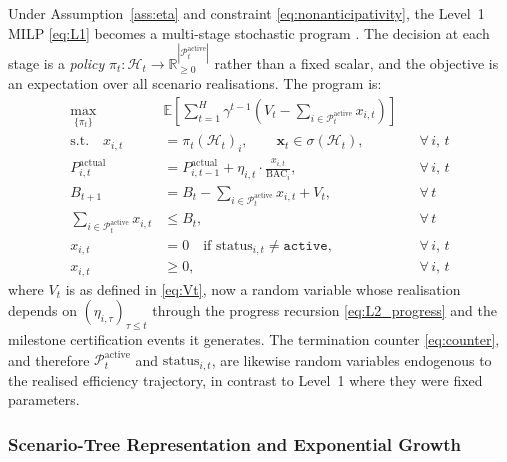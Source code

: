 Under Assumption~\ref{ass:eta} and constraint \eqref{eq:nonanticipativity},
the Level~1 MILP \eqref{eq:L1} becomes a multi-stage stochastic program
\citep{Birge2011}. The decision at each stage is a \emph{policy}
$\pi_t : \mathcal{H}_t \to \mathbb{R}^{|\mathcal{P}_t^{\mathrm{active}}|}_{\geq 0}$
rather than a fixed scalar, and the objective is an expectation over
all scenario realisations. The program is:
\begin{subequations}
\label{eq:L2}
\begin{align}
  \max_{\{\pi_t\}} \quad
  & \mathbb{E}\!\left[
      \sum_{t=1}^{H} \gamma^{t-1}\!\left(
        V_t - \sum_{i \in \mathcal{P}_t^{\mathrm{active}}} x_{i,t}
      \right)
    \right]
  \label{eq:L2_obj} \\[4pt]
  \text{s.t.} \quad
  x_{i,t} &= \pi_t(\mathcal{H}_t)_i,
  \qquad \mathbf{x}_t \in \sigma(\mathcal{H}_t),
  && \forall\, i,\, t
  \label{eq:L2_nonant} \\
  P_{i,t}^{\mathrm{actual}}
    &= P_{i,t-1}^{\mathrm{actual}}
       + \eta_{i,t} \cdot \frac{x_{i,t}}{\mathrm{BAC}_i},
    && \forall\, i,\, t
  \label{eq:L2_progress} \\
  B_{t+1}
    &= B_t
       - \sum_{i \in \mathcal{P}_t^{\mathrm{active}}} x_{i,t}
       + V_t,
    && \forall\, t
  \label{eq:L2_balance} \\
  \sum_{i \in \mathcal{P}_t^{\mathrm{active}}} x_{i,t}
    &\leq B_t,
    && \forall\, t
  \label{eq:L2_budget} \\
  x_{i,t} &= 0
    \quad \text{if } \mathrm{status}_{i,t} \neq \texttt{active},
    && \forall\, i,\, t
  \label{eq:L2_inactive} \\
  x_{i,t} &\geq 0,
    && \forall\, i,\, t
  \label{eq:L2_nonneg}
\end{align}
\end{subequations}
where $V_t$ is as defined in \eqref{eq:Vt}, now a random variable
whose realisation depends on $(\eta_{i,\tau})_{\tau \leq t}$ through
the progress recursion \eqref{eq:L2_progress} and the milestone
certification events it generates. The termination counter
\eqref{eq:counter}, and therefore $\mathcal{P}_t^{\mathrm{active}}$
and $\mathrm{status}_{i,t}$, are likewise random variables endogenous
to the realised efficiency trajectory, in contrast to Level~1 where
they were fixed parameters.

\subsubsection{Scenario-Tree Representation and Exponential Growth}
\label{subsubsec:l2_tree}

